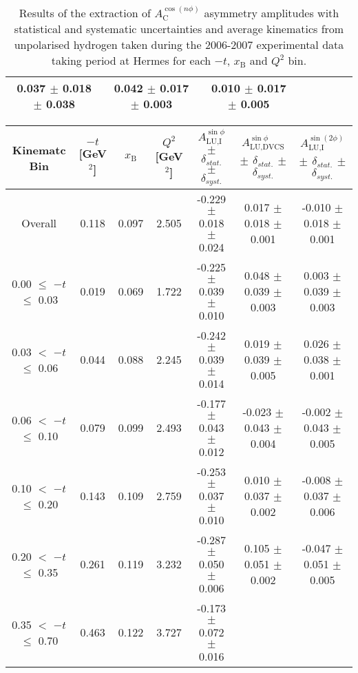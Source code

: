 \begin{table}[width=15cm]
\begin{center}
{\begin{tabular}{|c|c|c|c|c|c|c|c|}
0.037  $\pm$  0.018  $\pm$  0.038 & 0.042 $\pm$   0.017  $\pm$  0.003 & 0.010   $\pm$  0.017   $\pm$   0.005\\
\hline
  \end{tabular}
}
 \end{center}
\caption{Results of the extraction of $A_{\textrm{C}}^{\cos(n\phi)}$ asymmetry amplitudes with statistical and systematic uncertainties and average kinematics from unpolarised hydrogen taken during
the 2006-2007 experimental data taking period at H{\sc ermes} for each $-t$, $x_{\textrm{B}}$ and $Q^{2}$ bin.}
\end{table}


\begin{table}[width=15cm]
 \begin{center}
\resizebox{16cm}{!} {
  \begin{tabular}{|c|c|c|c|c|c|c|}
\hline
Kinematc Bin &  $-t$ [GeV$^{2}$] & $x_{\textrm{B}}$ & $Q^{2}$ [GeV$^{2}$] & 
$A_{\textrm{LU,I}}^{\sin\phi}$ $\pm$ $\delta_{stat.}$ $\pm$ $\delta_{syst.}$ & $A_{\textrm{LU,DVCS}}^{\sin\phi}$ $\pm$ $\delta_{stat.}$ $\pm$ $\delta_{syst.}$
& $A_{\textrm{LU,I}}^{\sin(2\phi)}$ $\pm$ $\delta_{stat.}$ $\pm$ $\delta_{syst.}$ \\
\hline
\hline
Overall &  0.118 & 0.097 &  2.505 &  -0.229  $\pm$  0.018  $\pm$   0.024 &
 0.017  $\pm$  0.018  $\pm$  0.001 & -0.010  $\pm$  0.018  $\pm$   0.001 \\
\hline
0.00 $\leqslant$ $-t$ $\leqslant$ 0.03 &  0.019 & 0.069 &  1.722 &  -0.225  $\pm$  0.039 $\pm$   0.010 &
 0.048  $\pm$  0.039   $\pm$  0.003 & 0.003  $\pm$  0.039  $\pm$   0.003\\
0.03 $<$ $-t$ $\leqslant$ 0.06 &  0.044 & 0.088 &  2.245 &  -0.242 $\pm$   0.039   $\pm$  0.014 &
 0.019 $\pm$   0.039  $\pm$   0.005 & 0.026  $\pm$  0.038  $\pm$   0.001\\
0.06 $<$ $-t$ $\leqslant$ 0.10 &  0.079 & 0.099 &  2.493 & -0.177 $\pm$   0.043   $\pm$  0.012 &
 -0.023  $\pm$  0.043  $\pm$   0.004 & -0.002  $\pm$  0.043   $\pm$  0.005 \\
0.10 $<$ $-t$ $\leqslant$ 0.20 &  0.143 & 0.109 &  2.759 &  -0.253 $\pm$   0.037  $\pm$   0.010 &
0.010  $\pm$  0.037  $\pm$   0.002 & -0.008  $\pm$  0.037  $\pm$  0.006\\
0.20 $<$ $-t$ $\leqslant$ 0.35 &  0.261 & 0.119 &  3.232 &  -0.287 $\pm$   0.050  $\pm$   0.006 &
0.105  $\pm$  0.051  $\pm$   0.002 & -0.047 $\pm$   0.051   $\pm$  0.005\\
0.35 $<$ $-t$ $\leqslant$ 0.70 &  0.463 & 0.122 &  3.727 &  -0.173  $\pm$  0.072  $\pm$   0.016 & 

\end{tabular}}
\end{center}
\end{table}
